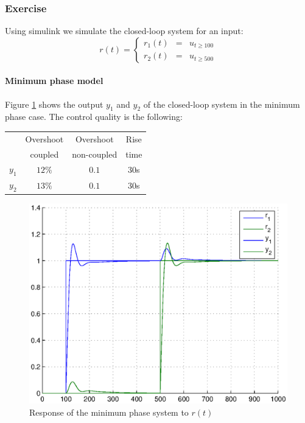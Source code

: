 \subsubsection{Exercise}

Using simulink we simulate the closed-loop system for an input:
$$ r(t) = \left\{\begin{array}{rcl} r_1(t) & = & u_{t\geq 100} \\ r_2(t) & = & u_{t\geq 500} \end{array}\right.$$

\paragraph{Minimum phase model}

Figure \ref{simum} shows the output $y_1$ and $y_2$ of the closed-loop system in the minimum phase case. 
The control quality is the following: 
\begin{center}
\begin{tabular}{|c|ccc|}
    \hline
    & Overshoot& Overshoot& Rise\\ 
    & coupled & non-coupled & time \\
    \hline
    $y_1$ & $12\%$ & $0.1$ & $30$s  \\
    $y_2$ & $13\%$ & $0.1$ & $30$s  \\
    \hline
\end{tabular}
\end{center}

\begin{figure}[h!t]
    \includegraphics[width=\columnwidth]{fig/controlledouputm.eps}
    \caption{Response of the minimum phase system to $r(t)$}
    \label{simum}
\end{figure}

